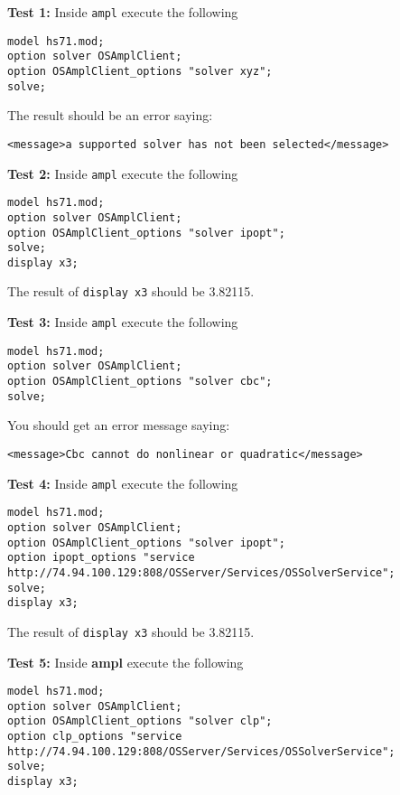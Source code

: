 \begin{itemize}
\begin{itemize}
 
 \vskip 10pt
 
 
 {\bf Test 1:}  Inside  {\tt ampl} execute the following
 


\begin{verbatim}
model hs71.mod;
option solver OSAmplClient;
option OSAmplClient_options "solver xyz";
solve;
\end{verbatim}

The result should be an error saying:
\begin{verbatim}
<message>a supported solver has not been selected</message>
\end{verbatim}
 
 \vskip 10pt
 
 {\bf Test 2:}  Inside  {\tt ampl} execute the following
 


\begin{verbatim}
model hs71.mod;
option solver OSAmplClient;
option OSAmplClient_options "solver ipopt";
solve;
display x3;
\end{verbatim}

The result of {\tt display x3} should be 3.82115. 


 \vskip 10pt
 
 {\bf Test 3:}  Inside  {\tt ampl} execute the following
 


\begin{verbatim}
model hs71.mod;
option solver OSAmplClient;
option OSAmplClient_options "solver cbc";
solve;
\end{verbatim}

You should get an error message saying:
\begin{verbatim}
<message>Cbc cannot do nonlinear or quadratic</message>
\end{verbatim}


\vskip 10pt

{\small
{\bf Test 4:}  Inside  {\tt ampl} execute the following
\begin{verbatim}
model hs71.mod;
option solver OSAmplClient;
option OSAmplClient_options "solver ipopt";
option ipopt_options "service http://74.94.100.129:808/OSServer/Services/OSSolverService";
solve;
display x3;
\end{verbatim}
}%

The result of {\tt display x3} should be 3.82115. 


\vskip 10pt

{\small
{\bf Test 5:}  Inside  {\bf ampl} execute the following
\begin{verbatim}
model hs71.mod;
option solver OSAmplClient;
option OSAmplClient_options "solver clp";
option clp_options "service  http://74.94.100.129:808/OSServer/Services/OSSolverService";
solve;
display x3;
\end{verbatim}
}%


\end{itemize}
\end{itemize}
